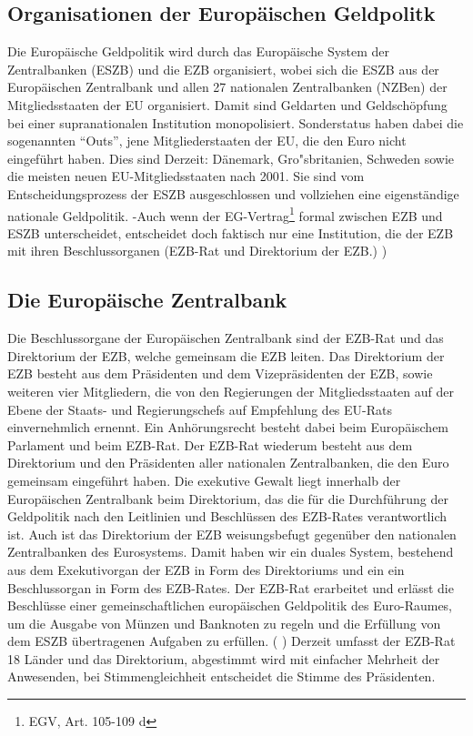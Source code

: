 \documentclass[
    onecolumn,
    a4paper,
    abstracton,
    parskip=half
    ,final
    ]{scrartcl}
\begin{document}
\subsection{Organisationen der Europ{\"a}ischen Geldpolitk}

Die Europ{\"a}ische Geldpolitik wird durch das Europ{\"a}ische System der Zentralbanken (ESZB) und die EZB organisiert, wobei sich die ESZB aus der Europ{\"a}ischen Zentralbank und allen 27 nationalen Zentralbanken (NZBen) der Mitgliedsstaaten der EU organisiert.  Damit sind Geldarten und Geldsch{\"o}pfung bei einer supranationalen Institution monopolisiert. Sonderstatus haben dabei die sogenannten "`Outs"', jene Mitgliederstaaten der EU, die den Euro  nicht eingef{\"u}hrt haben. Dies sind Derzeit: D{\"a}nemark, Gro{"s}britanien, Schweden sowie die meisten neuen EU-Mitgliedsstaaten nach 2001. Sie sind vom Entscheidungsprozess der ESZB ausgeschlossen und vollziehen eine eigenst{\"a}ndige nationale Geldpolitik.
-Auch wenn der EG-Vertrag\footnote[25]{EGV, Art. 105-109 d} formal zwischen EZB und ESZB unterscheidet, entscheidet doch faktisch nur eine Institution, die der EZB mit ihren Beschlussorganen (EZB-Rat und Direktorium der EZB.) \citep[vgl.][S.553]{Basseler2010})

\subsection{Die Europ{\"a}ische Zentralbank}
Die Beschlussorgane der Europ{\"a}ischen Zentralbank sind der EZB-Rat und das Direktorium der EZB, welche gemeinsam die EZB leiten. Das Direktorium der EZB besteht aus dem Pr{\"a}sidenten und dem Vizepr{\"a}sidenten der EZB, sowie weiteren vier Mitgliedern, die von den Regierungen der Mitgliedsstaaten auf der Ebene der Staats- und Regierungschefs auf Empfehlung des EU-Rats einvernehmlich ernennt. Ein Anh{\"o}rungsrecht besteht dabei beim Europ{\"a}ischem Parlament und beim EZB-Rat.
Der EZB-Rat wiederum besteht aus dem Direktorium und den Pr{\"a}sidenten aller nationalen Zentralbanken, die den Euro gemeinsam eingef{\"u}hrt haben.
Die exekutive Gewalt liegt innerhalb der Europ{\"a}ischen Zentralbank beim Direktorium, das die f{\"u}r die Durchf{\"u}hrung der Geldpolitik nach den Leitlinien und Beschl{\"u}ssen des EZB-Rates verantwortlich ist. Auch ist das Direktorium der EZB weisungsbefugt gegen{\"u}ber den nationalen Zentralbanken des Eurosystems.  Damit haben wir ein duales System, bestehend aus dem Exekutivorgan der EZB in Form des Direktoriums und ein ein Beschlussorgan in Form des EZB-Rates.
Der EZB-Rat erarbeitet und erl{\"a}sst die Beschl{\"u}sse einer gemeinschaftlichen europ{\"a}ischen Geldpolitik des Euro-Raumes, um die Ausgabe von M{\"u}nzen und Banknoten zu regeln und die Erf{\"u}llung von dem ESZB {\"u}bertragenen Aufgaben zu erf{\"u}llen.  ( \citep[vgl.][S.553]{Basseler2010} ) Derzeit umfasst der EZB-Rat 18 L{\"a}nder und das Direktorium, abgestimmt wird mit einfacher Mehrheit der Anwesenden, bei Stimmengleichheit entscheidet die Stimme des Pr{\"a}sidenten.
\end{document}
